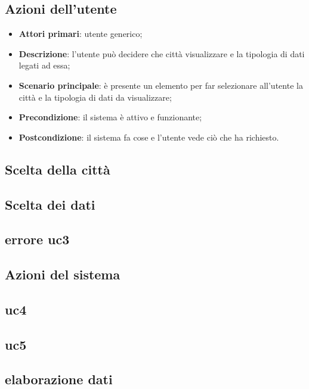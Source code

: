 \subsection{Azioni dell'utente}
\begin{itemize}
	\item \textbf{Attori primari}: utente generico;
	\item \textbf{Descrizione}: l'utente può decidere che città visualizzare e la tipologia di dati legati ad essa;
	\item \textbf{Scenario principale}: è presente un elemento per far selezionare all'utente la città e la tipologia di dati da visualizzare;
	\item \textbf{Precondizione}: il sistema è attivo e funzionante;
	\item \textbf{Postcondizione}: il sistema fa cose e l'utente vede ciò che ha richiesto.
\end{itemize}
\subsection{Scelta della città}
\subsection{Scelta dei dati}
\subsection{errore uc3}
\subsection{Azioni del sistema}
\subsection{uc4}
\subsection{uc5}
\subsection{elaborazione dati}


